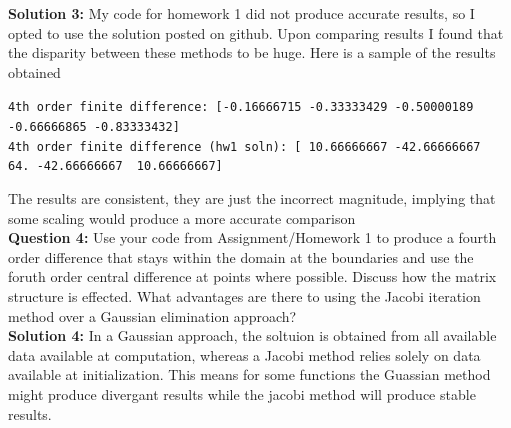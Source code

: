 \documentclass[10pt]{article}
\newcommand{\1}{\mathbb{1}}
\begin{document}
\textbf{Solution 3:} My code for homework 1 did not produce accurate results, so I opted to use the solution posted on github. Upon comparing results I found that the disparity between these methods to be huge. Here is a sample of the results obtained

\verb|4th order finite difference: [-0.16666715 -0.33333429 -0.50000189 -0.66666865 -0.83333432]|\\
\verb|4th order finite difference (hw1 soln): [ 10.66666667 -42.66666667  64. -42.66666667  10.66666667]|

The results are consistent, they are just the incorrect magnitude, implying that some scaling would produce a more accurate comparison\\

\textbf{Question 4:} Use your code from Assignment/Homework 1 to produce a fourth order difference that stays within the domain at the boundaries and use the foruth order central difference at points where possible. Discuss how the matrix structure is effected. What advantages are there to using the Jacobi iteration method over a Gaussian elimination approach?\\

\textbf{Solution 4:} In a Gaussian approach, the soltuion is obtained from all available data available at computation, whereas a Jacobi method relies solely on data available at initialization. This means for some functions the Guassian method might produce divergant results while the jacobi method will produce stable results. 

\noindent \underline{\hspace{3in}}\\
\end{document}
